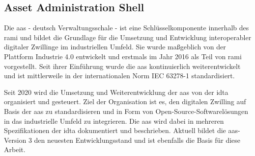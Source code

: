 

\newpage
\subsection{Asset Administration Shell}
\label{chap:AAS}



Die \acs{aas} - deutsch Verwaltungsschale - ist eine Schlüsselkomponente innerhalb des \ac{rami} \cite{RAMI4.0} und bildet die Grundlage für die Umsetzung und Entwicklung interoperabler digitaler Zwillinge im industriellen Umfeld.
Sie wurde maßgeblich von der Plattform Industrie 4.0 entwickelt und erstmals im Jahr 2016 als Teil von \acs{rami} vorgestellt.
Seit ihrer Einführung wurde die \acs{aas} kontinuierlich weiterentwickelt und ist mittlerweile in der internationalen Norm IEC 63278-1 \cite{AASIEC63278} standardisiert.

Seit 2020 wird die Umsetzung und Weiterentwicklung der \acs{aas} von der \acs{idta} \cite{IDTA} organisiert und gesteuert.
Ziel der Organisation ist es, den digitalen Zwilling auf Basis der \acs{aas} zu standardisieren und in Form von Open-Source-Softwarelösungen in das industrielle Umfeld zu integrieren.
Die \acs{aas} wird dabei in mehreren Spezifikationen der \acs{idta} dokumentiert und beschrieben.
Aktuell bildet die \acs{aas}-Version 3 den neuesten Entwicklungsstand und ist ebenfalls die Basis für diese Arbeit.

